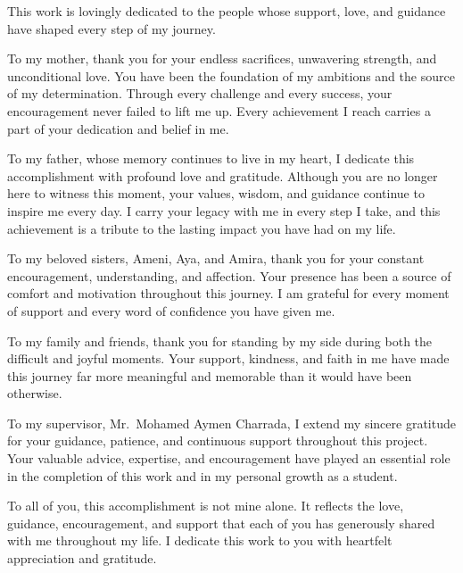 \documentclass[12pt,a4paper,oneside]{report}
\begin{document}
{
\hspace{0.8cm}This work is lovingly dedicated to the people whose support, love, and guidance have shaped every step of my journey.

\medskip

\hspace{0.8cm}To my mother, thank you for your endless sacrifices, unwavering strength, and unconditional love. You have been the foundation of my ambitions and the source of my determination. Through every challenge and every success, your encouragement never failed to lift me up. Every achievement I reach carries a part of your dedication and belief in me.

\medskip

\hspace{0.8cm}To my father, whose memory continues to live in my heart, I dedicate this accomplishment with profound love and gratitude. Although you are no longer here to witness this moment, your values, wisdom, and guidance continue to inspire me every day. I carry your legacy with me in every step I take, and this achievement is a tribute to the lasting impact you have had on my life.

\medskip

\hspace{0.8cm}To my beloved sisters, Ameni, Aya, and Amira, thank you for your constant encouragement, understanding, and affection. Your presence has been a source of comfort and motivation throughout this journey. I am grateful for every moment of support and every word of confidence you have given me.

\medskip

\hspace{0.8cm}To my family and friends, thank you for standing by my side during both the difficult and joyful moments. Your support, kindness, and faith in me have made this journey far more meaningful and memorable than it would have been otherwise.

\medskip

\hspace{0.8cm}To my supervisor, Mr.\ Mohamed Aymen Charrada, I extend my sincere gratitude for your guidance, patience, and continuous support throughout this project. Your valuable advice, expertise, and encouragement have played an essential role in the completion of this work and in my personal growth as a student.

\medskip

\hspace{0.8cm}To all of you, this accomplishment is not mine alone. It reflects the love, guidance, encouragement, and support that each of you has generously shared with me throughout my life. I dedicate this work to you with heartfelt appreciation and gratitude.
}
\end{document}

